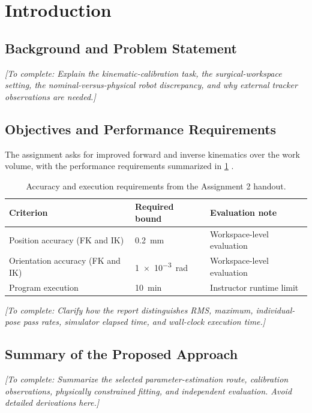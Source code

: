 \documentclass[11pt,letterpaper]{article}
\newcommand{\placeholder}[1]{{\color{placeholdergray}\itshape [To complete: #1]}}
\begin{document}
\tableofcontents
\clearpage
\hypersetup{pageanchor=true}

\section{Introduction}\label{sec:introduction}
\subsection{Background and Problem Statement}
\placeholder{Explain the kinematic-calibration task, the surgical-workspace setting, the nominal-versus-physical robot discrepancy, and why external tracker observations are needed.}

\subsection{Objectives and Performance Requirements}
The assignment asks for improved forward and inverse kinematics over the work volume, with the performance requirements summarized in \cref{tab:requirements} \parencite{cisi_assignment2}.
\begin{table}[htbp]\centering
\caption{Accuracy and execution requirements from the Assignment 2 handout.}\label{tab:requirements}
\begin{tabular}{@{}lll@{}}\toprule
Criterion & Required bound & Evaluation note\\\midrule
Position accuracy (FK and IK) & \SI{0.2}{\milli\metre} & Workspace-level evaluation\\
Orientation accuracy (FK and IK) & \SI{1e-3}{\radian} & Workspace-level evaluation\\
Program execution & \SI{10}{\minute} & Instructor runtime limit\\\bottomrule
\end{tabular}
\end{table}
\placeholder{Clarify how the report distinguishes RMS, maximum, individual-pose pass rates, simulator elapsed time, and wall-clock execution time.}

\subsection{Summary of the Proposed Approach}
\placeholder{Summarize the selected parameter-estimation route, calibration observations, physically constrained fitting, and independent evaluation. Avoid detailed derivations here.}
\end{document}
